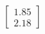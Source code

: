 \documentclass[preview]{standalone}
\begin{document}
\begin{align*}
\begin{bmatrix} 1.85 \\ 2.18 \end{bmatrix}
\end{align*}
\end{document}

